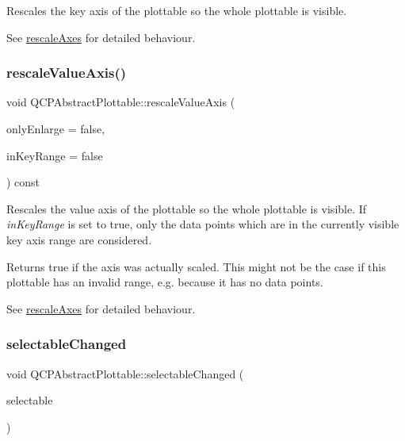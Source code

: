 Rescales the key axis of the plottable so the whole plottable is visible.

See \hyperlink{classQCPAbstractPlottable_a1491c4a606bccd2d09e65e11b79eb882}{rescale\+Axes} for detailed behaviour. \mbox{\label{classQCPAbstractPlottable_a714eaf36b12434cd71846215504db82e}} 
\subsubsection{\texorpdfstring{rescale\+Value\+Axis()}{rescaleValueAxis()}}
{\footnotesize\ttfamily void Q\+C\+P\+Abstract\+Plottable\+::rescale\+Value\+Axis (\begin{DoxyParamCaption}\item[{bool}]{only\+Enlarge = {\ttfamily false},  }\item[{bool}]{in\+Key\+Range = {\ttfamily false} }\end{DoxyParamCaption}) const}

Rescales the value axis of the plottable so the whole plottable is visible. If {\itshape in\+Key\+Range} is set to true, only the data points which are in the currently visible key axis range are considered.

Returns true if the axis was actually scaled. This might not be the case if this plottable has an invalid range, e.\+g. because it has no data points.

See \hyperlink{classQCPAbstractPlottable_a1491c4a606bccd2d09e65e11b79eb882}{rescale\+Axes} for detailed behaviour. \mbox{\label{classQCPAbstractPlottable_a663b1a44123c8340ac041a29d1e2c973}} 
\subsubsection{\texorpdfstring{selectable\+Changed}{selectableChanged}}
{\footnotesize\ttfamily void Q\+C\+P\+Abstract\+Plottable\+::selectable\+Changed (\begin{DoxyParamCaption}\item[{\hyperlink{namespaceQCP_ac6cb9db26a564b27feda362a438db038}{Q\+C\+P\+::\+Selection\+Type}}]{selectable }\end{DoxyParamCaption})\hspace{0.3cm}{\ttfamily [signal]}}

